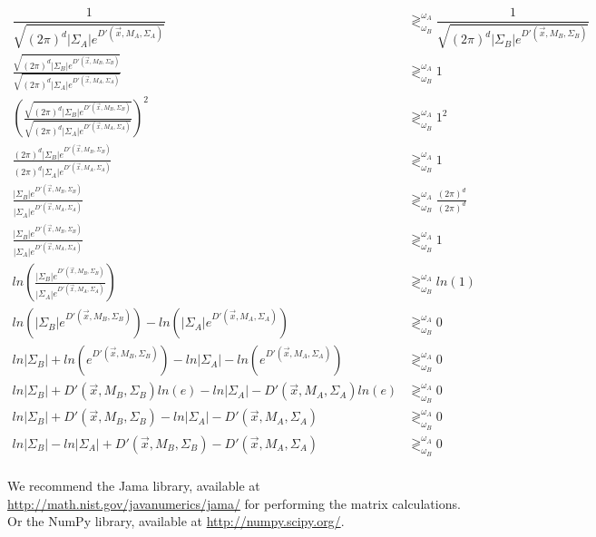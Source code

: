 \documentclass{article}
\begin{document}
\begin{align*}
  \dfrac{1}{\sqrt{(2\pi)^d |\Sigma_A| e^{D'(\vec{x},M_A,\Sigma_A)}}} 
  &\gtrless^{\omega_A}_{\omega_B}
  \dfrac{1}{\sqrt{(2\pi)^d |\Sigma_B| e^{D'(\vec{x},M_B,\Sigma_B)}}} \\
  \frac{\sqrt{(2\pi)^d |\Sigma_B|
      e^{D'(\vec{x},M_B,\Sigma_B)}}}{\sqrt{(2\pi)^d |\Sigma_A|
      e^{D'(\vec{x},M_A,\Sigma_A)}}}
  &\gtrless^{\omega_A}_{\omega_B}
  1 \\
  \left(
  \frac{\sqrt{(2\pi)^d |\Sigma_B|
      e^{D'(\vec{x},M_B,\Sigma_B)}}}{\sqrt{(2\pi)^d |\Sigma_A|
      e^{D'(\vec{x},M_A,\Sigma_A)}}}
  \right)^2
  &\gtrless^{\omega_A}_{\omega_B}
  1^2 \\
  \frac{(2\pi)^d |\Sigma_B|
      e^{D'(\vec{x},M_B,\Sigma_B)}}{(2\pi)^d |\Sigma_A|
      e^{D'(\vec{x},M_A,\Sigma_A)}}
  &\gtrless^{\omega_A}_{\omega_B}
  1 \\
  \frac{|\Sigma_B|
      e^{D'(\vec{x},M_B,\Sigma_B)}}{|\Sigma_A|
      e^{D'(\vec{x},M_A,\Sigma_A)}}
  &\gtrless^{\omega_A}_{\omega_B}
  \frac{(2\pi)^d}{(2\pi)^d} \\
  \frac{|\Sigma_B|
      e^{D'(\vec{x},M_B,\Sigma_B)}}{|\Sigma_A|
      e^{D'(\vec{x},M_A,\Sigma_A)}}
  &\gtrless^{\omega_A}_{\omega_B}
  1 \\
  ln \left(
  \frac{|\Sigma_B|
      e^{D'(\vec{x},M_B,\Sigma_B)}}{|\Sigma_A|
      e^{D'(\vec{x},M_A,\Sigma_A)}}
  \right)
  &\gtrless^{\omega_A}_{\omega_B}
  ln(1) \\
  ln(|\Sigma_B|e^{D'(\vec{x},M_B,\Sigma_B)}) -
  ln(|\Sigma_A|e^{D'(\vec{x},M_A,\Sigma_A)})
  &\gtrless^{\omega_A}_{\omega_B}
  0 \\
  ln|\Sigma_B| + ln(e^{D'(\vec{x},M_B,\Sigma_B)}) -
  ln|\Sigma_A| - ln(e^{D'(\vec{x},M_A,\Sigma_A)})
  &\gtrless^{\omega_A}_{\omega_B}
  0 \\
  ln|\Sigma_B| + D'(\vec{x},M_B,\Sigma_B)ln(e) -
  ln|\Sigma_A| - D'(\vec{x},M_A,\Sigma_A)ln(e)
  &\gtrless^{\omega_A}_{\omega_B}
  0 \\
  ln|\Sigma_B| + D'(\vec{x},M_B,\Sigma_B) -
  ln|\Sigma_A| - D'(\vec{x},M_A,\Sigma_A)
  &\gtrless^{\omega_A}_{\omega_B}
  0 \\
  ln|\Sigma_B| - ln|\Sigma_A| +
  D'(\vec{x},M_B,\Sigma_B) - D'(\vec{x},M_A,\Sigma_A)
  &\gtrless^{\omega_A}_{\omega_B}
  0 \\
\end{align*}

We recommend the Jama library, available at
\href{http://math.nist.gov/javanumerics/jama/}{http://math.nist.gov/javanumerics/jama/}
for performing the matrix calculations.  Or the NumPy library,
available at \href{http://numpy.scipy.org/}{http://numpy.scipy.org/}.
\end{document}

